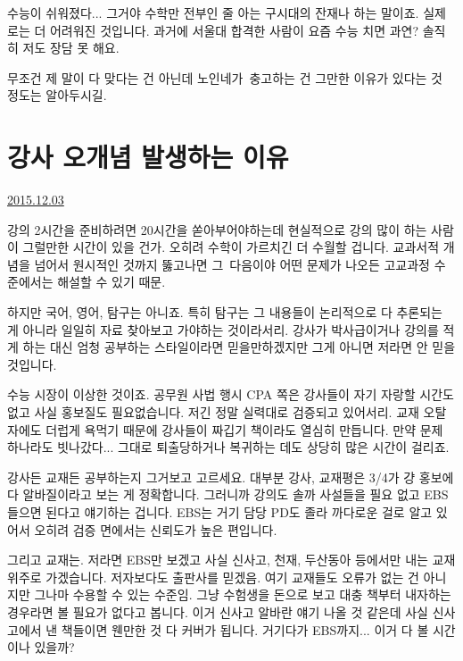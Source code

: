 수능이 쉬워졌다... 그거야 수학만 전부인 줄 아는 구시대의 잔재나 하는 말이죠.
실제로는 더 어려워진 것입니다.
과거에 서울대 합격한 사람이 요즘 수능 치면 과연? 솔직히 저도 장담 못 해요.
\vspace{5mm}

무조건 제 말이 다 맞다는 건 아닌데
노인네가 충고하는 건 그만한 이유가 있다는 것 정도는 알아두시길.
\vspace{5mm}









\section{강사 오개념 발생하는 이유}
\href{https://www.kockoc.com/Apoc/524777}{2015.12.03}

\vspace{5mm}

강의 2시간을 준비하려면 20시간을 쏟아부어야하는데
현실적으로 강의 많이 하는 사람이 그럴만한 시간이 있을 건가.
오히려 수학이 가르치긴 더 수월할 겁니다. 교과서적 개념을 넘어서 원시적인 것까지 뚫고나면
그 다음이야 어떤 문제가 나오든 고교과정 수준에서는 해설할 수 있기 때문.
\vspace{5mm}

하지만 국어, 영어, 탐구는 아니죠.
특히 탐구는 그 내용들이 논리적으로 다 추론되는 게 아니라 일일히 자료 찾아보고 가야하는 것이라서리.
강사가 박사급이거나 강의를 적게 하는 대신 엄청 공부하는 스타일이라면 믿을만하겠지만 그게 아니면 저라면 안 믿을 것입니다.
\vspace{5mm}

수능 시장이 이상한 것이죠.
공무원 사법 행시 CPA 쪽은 강사들이 자기 자랑할 시간도 없고 사실 홍보질도 필요없습니다.
저긴 정말 실력대로 검증되고 있어서리. 교재 오탈자에도 더럽게 욕먹기 때문에 강사들이 짜깁기 책이라도 열심히 만듭니다.
만약 문제 하나라도 빗나갔다... 그대로 퇴출당하거나 복귀하는 데도 상당히 많은 시간이 걸리죠.
\vspace{5mm}

강사든 교재든 공부하는지 그거보고 고르세요. 대부분 강사, 교재평은 3/4가 걍 홍보에다 알바질이라고 보는 게 정확합니다.
그러니까 강의도 솔까 사설들을 필요 없고 EBS 들으면 된다고 얘기하는 겁니다.
EBS는 거기 담당 PD도 졸라 까다로운 걸로 알고 있어서 오히려 검증 면에서는 신뢰도가 높은 편입니다.
\vspace{5mm}

그리고 교재는.
저라면 EBS만 보겠고 사실 신사고, 천재, 두산동아 등에서만 내는 교재 위주로 가겠습니다.
저자보다도 출판사를 믿겠음. 여기 교재들도 오류가 없는 건 아니지만 그나마 수용할 수 있는 수준임.
그냥 수험생을 돈으로 보고 대충 책부터 내자하는 경우라면 볼 필요가 없다고 봅니다.
이거 신사고 알바란 얘기 나올 것 같은데 사실 신사고에서 낸 책들이면 웬만한 것 다 커버가 됩니다.
거기다가 EBS까지... 이거 다 볼 시간이나 있을까?
\vspace{5mm}

